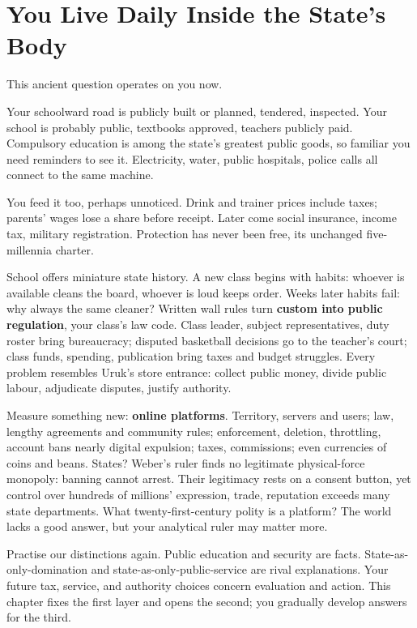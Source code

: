 \section{You Live Daily Inside the State's Body}
This ancient question operates on you now.

Your schoolward road is publicly built or planned, tendered, inspected. Your school is probably public, textbooks approved, teachers publicly paid. Compulsory education is among the state's greatest public goods, so familiar you need reminders to see it. Electricity, water, public hospitals, police calls all connect to the same machine.

You feed it too, perhaps unnoticed. Drink and trainer prices include taxes; parents' wages lose a share before receipt. Later come social insurance, income tax, military registration. Protection has never been free, its unchanged five-millennia charter.

School offers miniature state history. A new class begins with habits: whoever is available cleans the board, whoever is loud keeps order. Weeks later habits fail: why always the same cleaner? Written wall rules turn \textbf{custom into public regulation}, your class's law code. Class leader, subject representatives, duty roster bring bureaucracy; disputed basketball decisions go to the teacher's court; class funds, spending, publication bring taxes and budget struggles. Every problem resembles Uruk's store entrance: collect public money, divide public labour, adjudicate disputes, justify authority.

Measure something new: \textbf{online platforms}. Territory, servers and users; law, lengthy agreements and community rules; enforcement, deletion, throttling, account bans nearly digital expulsion; taxes, commissions; even currencies of coins and beans. States? Weber's ruler finds no legitimate physical-force monopoly: banning cannot arrest. Their legitimacy rests on a consent button, yet control over hundreds of millions' expression, trade, reputation exceeds many state departments. What twenty-first-century polity is a platform? The world lacks a good answer, but your analytical ruler may matter more.

Practise our distinctions again. Public education and security are facts. State-as-only-domination and state-as-only-public-service are rival explanations. Your future tax, service, and authority choices concern evaluation and action. This chapter fixes the first layer and opens the second; you gradually develop answers for the third.

